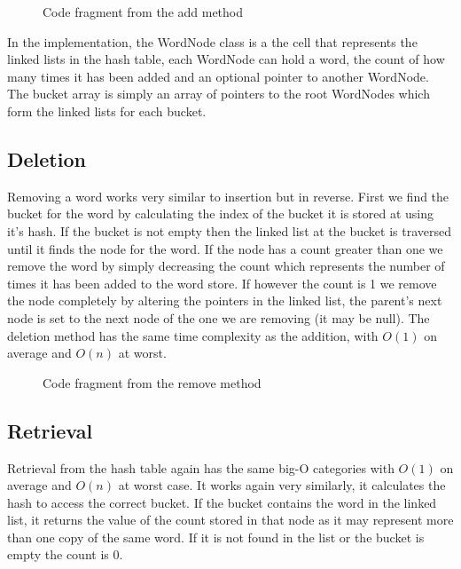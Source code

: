 \documentclass[12pt]{article}
\begin{document}
\begin{figure}[!htp]
\centering
{}
\caption{Code fragment from the add method}
\label{lst:addition_method}
\end{figure}

In the implementation, the WordNode class is a the cell that represents the linked lists in the hash table, each WordNode can hold a word, the count of how many times it has been added and an optional pointer to another WordNode. The bucket array is simply an array of pointers to the root WordNodes which form the linked lists for each bucket.

\subsection{Deletion}
Removing a word works very similar to insertion but in reverse. First we find the bucket for the word by calculating the index of the bucket it is stored at using it's hash. If the bucket is not empty then the linked list at the bucket is traversed until it finds the node for the word. If the node has a count greater than one we remove the word by simply decreasing the count which represents the number of times it has been added to the word store. If however the count is 1 we remove the node completely by altering the pointers in the linked list, the parent's next node is set to the next node of the one we are removing (it may be null). The deletion method has the same time complexity as the addition, with $O(1)$ on average and $O(n)$ at worst.

\begin{figure}[!htp]
\centering
{}
\caption{Code fragment from the remove method}
\label{lst:remove_method}
\end{figure}

\subsection{Retrieval}
Retrieval from the hash table again has the same big-O categories with $O(1)$ on average and $O(n)$ at worst case. It works again very similarly, it calculates the hash to access the correct bucket. If the bucket contains the word in the linked list, it returns the value of the count stored in that node as it may represent more than one copy of the same word. If it is not found in the list or the bucket is empty the count is 0.
\end{document}
